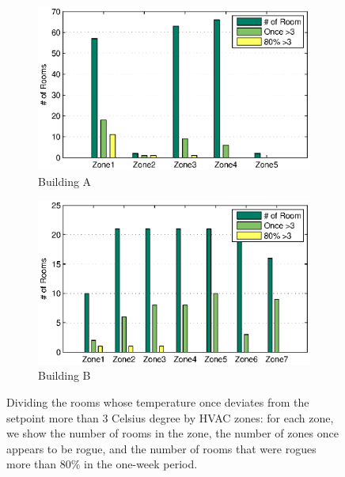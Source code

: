 \begin{figure}[h!]
\centering
	\begin{subfigure}{0.48\textwidth}
                \centering
		\includegraphics[width=\textwidth]{./figs/rogue_soda.eps}
                \caption{Building A}
	\end{subfigure}
	\begin{subfigure}{0.48\textwidth}
                \centering
		\includegraphics[width=\textwidth]{./figs/rogue_sdh.eps}
                \caption{Building B}
	\end{subfigure}
\caption{Dividing the rooms whose temperature once deviates from the setpoint more than 3 Celsius degree by HVAC zones: for each zone, we show the number of rooms in the zone, the number of zones once appears to be rogue, and the number of rooms that were rogues more than 80\% in the one-week period.} 
\label{fig:rogue}
\end{figure}